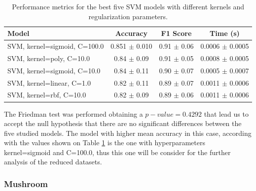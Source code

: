 \begin{table}[h!]
\centering
\begin{tabular}{lccc}
\toprule
\textbf{Model} & \textbf{Accuracy} & \textbf{F1 Score} & \textbf{Time (s)} \\
\midrule
SVM, kernel=sigmoid, C=100.0 & 0.851 $\pm$ 0.010 & 0.91 $\pm$ 0.06 & 0.0006 $\pm$ 0.0005 \\
SVM, kernel=poly, C=10.0     & 0.84 $\pm$ 0.09 & 0.91 $\pm$ 0.05 & 0.0008 $\pm$ 0.0005 \\
SVM, kernel=sigmoid, C=10.0  & 0.84 $\pm$ 0.11 & 0.90 $\pm$ 0.07 & 0.0005 $\pm$ 0.0007 \\
SVM, kernel=linear, C=1.0    & 0.82 $\pm$ 0.11 & 0.89 $\pm$ 0.07 & 0.0011 $\pm$ 0.0006 \\
SVM, kernel=rbf, C=10.0      & 0.82 $\pm$ 0.09 & 0.89 $\pm$ 0.06 & 0.0011 $\pm$ 0.0006 \\
\bottomrule
\end{tabular}
\caption{Performance metrics for the best five SVM models with different kernels and regularization parameters.}
\label{tab:svm_metrics}
\end{table}

The Friedman test was performed obtaining a $p-value=0.4292$ that lead us to accept the null hypothesis that there are no significant differences between the five studied models. The model with higher mean accuracy in this case, according with the values shown on Table \ref{tab:svm_metrics} is the one with hyperparameters kernel=sigmoid and C=100.0, thus this one will be consider for the further analysis of the reduced datasets.



\subsubsection{Mushroom}
